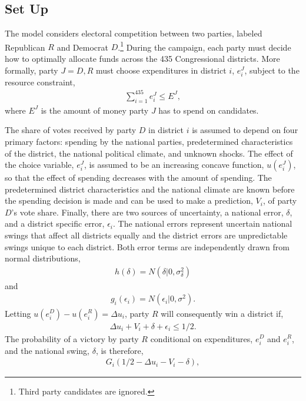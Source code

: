 \documentclass[12pt,final,fleqn]{article}
\theoremstyle{plain}
\begin{document}
\subsection{Set Up}
The model considers electoral competition between two parties, labeled Republican $R$ and Democrat $D$.\footnote{Third party candidates are ignored.} During the campaign, each party must decide how to optimally allocate funds across the 435 Congressional districts. More formally, party $J = D, R$ must choose expenditures in district $i$, $e^J_i$, subject to the resource constraint, 
\begin{align} \label{eqn: budget constraint}
\sum_{i=1}^{435} e^J_i \leq E^J,
\end{align}
where $E^J$ is the amount of money party $J$ has to spend on candidates.

The share of votes received by party $D$ in district $i$ is assumed to depend on four primary factors: spending by the national parties, predetermined characteristics of the district, the national political climate, and unknown shocks. The effect of the choice variable, $e^J_i$, is assumed to be an increasing concave function, $u(e^J_i)$, so that the effect of spending decreases with the amount of spending. The predetermined district characteristics and the national climate are known before the spending decision is made and can be used to make a prediction, $V_i$, of party $D$'s vote share. Finally, there are two sources of uncertainty, a national error, $\delta$, and a district specific error, $\epsilon_i$. The national errors represent uncertain national swings that affect all districts equally and the district errors are unpredictable swings unique to each district. Both error terms are independently drawn from normal distributions,
\begin{align}
h(\delta) = N(\delta|0, \sigma^2_\delta)
\end{align}
and 
\begin{align}
g_i(\epsilon_i) = N(\epsilon_i|0, \sigma^2).
\end{align}
Letting $u(e^D_i) - u(e^R_i) = \Delta u_i$, party $R$ will consequently win a district if,
\begin{align} \label{eqn: Republican wins}
\Delta u_i + V_i + \delta + \epsilon_i \leq 1/2.
\end{align}
The probability of a victory by party $R$ conditional on expenditures, $e^D_i$ and $e^R_i$, and the national swing, $\delta$, is therefore,
\begin{align*}
G_i(1/2 - \Delta u_i - V_i - \delta),
\end{align*}
\end{document}
